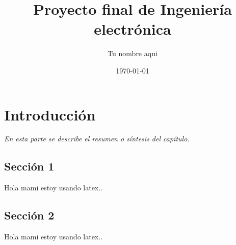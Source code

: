 \documentclass[]{book}
\title{\bf Proyecto final de Ingeniería electrónica}
\author{Tu nombre aqui}
\date{\today}
\begin{document}
\frontmatter
\maketitle
\tableofcontents

\mainmatter
\chapter{Introducción}
\begin{center}
\textit{En esta parte se describe el resumen o síntesis
del capítulo.}
\end{center}

\section{Sección 1}
Hola mami estoy usando latex..
\section{Sección 2}
Hola mami estoy usando latex..
\end{document}

